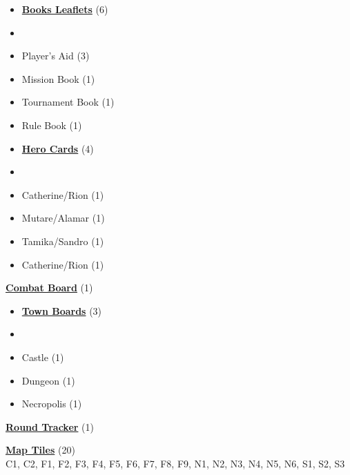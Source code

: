 

\begin{multicols*}{3}

\footnotesize

\begin{itemize}[leftmargin=0pt, label={}, noitemsep]
  \item \textbf{\small{\underline{Books Leaflets}}} (6)
  \item
  \item Player's Aid (3)
  \item Mission Book (1)
  \item Tournament Book (1)
  \item Rule Book (1)
\end{itemize}

\begin{itemize}[leftmargin=0pt, label={}, noitemsep]
  \item \textbf{\small{\underline{Hero Cards}}} (4)
  \item
  \item Catherine/Rion (1)
  \item Mutare/Alamar (1)
  \item Tamika/Sandro (1)
  \item Catherine/Rion (1)
\end{itemize}

\textbf{\small{\underline{Combat Board}}} (1)

\begin{itemize}[leftmargin=0pt, label={}, noitemsep]
  \item \textbf{\small{\underline{Town Boards}}} (3)
  \item
  \item Castle (1)
  \item Dungeon (1)
  \item Necropolis (1)
\end{itemize}

\textbf{\small{\underline{Round Tracker}}} (1)

\textbf{\small{\underline{Map Tiles}}} (20)\\

C1, C2, F1, F2, F3, F4, F5, F6, F7, F8, F9, N1, N2, N3, N4, N5, N6, S1, S2, S3


\end{multicols*}
